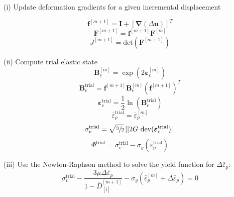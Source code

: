 \documentclass[sn-mathphys,Numbered]{sn-jnl}%
\newcommand{\bb}{\boldsymbol}
\begin{document}
\begin{algorithm}[htbp] \label{alg:lemaitre} \footnotesize
\SetAlgoLined
(i) Update deformation gradients for a given incremental displacement

\begin{equation}
  \bb{f}^{[m+1]} = \bb{I} + \left[ \bb{\nabla}(\Delta\textbf{u}) \right]^T \nonumber
\end{equation}
\begin{equation}
  \bb{F}^{[m+1]} = \bb{f}^{[m+1]} \bb{F}^{[m]}  \nonumber
\end{equation}
\begin{equation}
  J^{[m+1]} = \text{det} \left( \bb{F}^{[m+1]} \right) \nonumber
\end{equation}

(ii) Compute trial elastic state
\begin{equation}
\bb{B}_{e}^{[m]} = \exp\left({2\boldsymbol{\varepsilon}_{e}^{[m]}}\right) \nonumber
\end{equation}
\begin{equation}
\bb{B}_{e}^{\text{trial}} = \bb{f}^{[m+1]}  \bb{B}_{e}^{[m]}  \left(\bb{f}^{[m+1]}\right)^{T}\nonumber
\end{equation}
\begin{equation}
\boldsymbol{\varepsilon}_{e}^{\text{trial}} = \frac{1}{2} \ln(\textbf{B}_{e}^{\text{trial}}) \nonumber
\end{equation}
\begin{equation}
\bar{\varepsilon}^{\text{trial}}_p = \bar{\varepsilon}^{[m]}_p \nonumber
\end{equation}
\begin{equation}
\sigma_{v}^{\text{trial}} = \sqrt{\sfrac{3}{2}} \, || 2G\ \text{dev}(\boldsymbol{\varepsilon}_{e}^{\text{trial}})|| \nonumber
\end{equation}
\begin{equation}
\Phi^{\text{trial}} =  \sigma_{v}^{\text{trial}} - \sigma_{y}(\bar{\varepsilon}^{\text{trial}}_p) \nonumber 
\end{equation}

(iii) Use the Newton-Raphson method to solve the yield function for $\Delta\bar{\varepsilon}_p$:
\begin{equation}
	\sigma_{v}^{\text{trial}} 
	- \frac{ 3\mu \Delta\bar{\varepsilon}_p }{1 - \bar{D}^{[m+1]}_{[i]}}
	-\sigma_{y}(\bar{\varepsilon}^{[m]}_p + \Delta\bar{\varepsilon}_p) = 0 \nonumber
\end{equation}


\end{algorithm}
\end{document}
